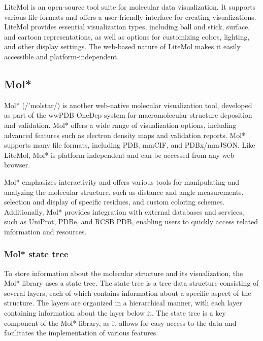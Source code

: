 \documentclass[
  digital,     %
  oneside,     %
  nosansbold,  %
  nocolorbold, %
  lof,         %
  lot,         %
]{fithesis4}
\begin{document}
LiteMol is an open-source tool suite for molecular data visualization. It supports various file formats and offers a user-friendly interface for creating visualizations. LiteMol provides essential visualization types, including ball and stick, surface, and cartoon representations, as well as options for customizing colors, lighting, and other display settings. The web-based nature of LiteMol makes it easily accessible and platform-independent. \cite{sehnal2017litemol}

\subsection{Mol*}
\label{subsection:molstar}

Mol* (/'molstar/) is another web-native molecular visualization tool, developed as part of the wwPDB OneDep system for macromolecular structure deposition and validation. Mol* offers a wide range of visualization options, including advanced features such as electron density maps and validation reports. Mol* supports many file formats, including PDB, mmCIF, and PDBx/mmJSON. Like LiteMol, Mol* is platform-independent and can be accessed from any web browser. \cite{sehnal2021molstar}

Mol* emphasizes interactivity and offers various tools for manipulating and analyzing the molecular structure, such as distance and angle measurements, selection and display of specific residues, and custom coloring schemes. Additionally, Mol* provides integration with external databases and services, such as UniProt, PDBe, and RCSB PDB, enabling users to quickly access related information and resources.

\subsubsection{Mol* state tree}

To store information about the molecular structure and its visualization, the Mol* library uses a state tree. The state tree is a tree data structure consisting of several layers, each of which contains information about a specific aspect of the structure. The layers are organized in a hierarchical manner, with each layer containing information about the layer below it. The state tree is a key component of the Mol* library, as it allows for easy access to the data and facilitates the implementation of various features. \cite{sehnal2021molstar}

\end{document}
